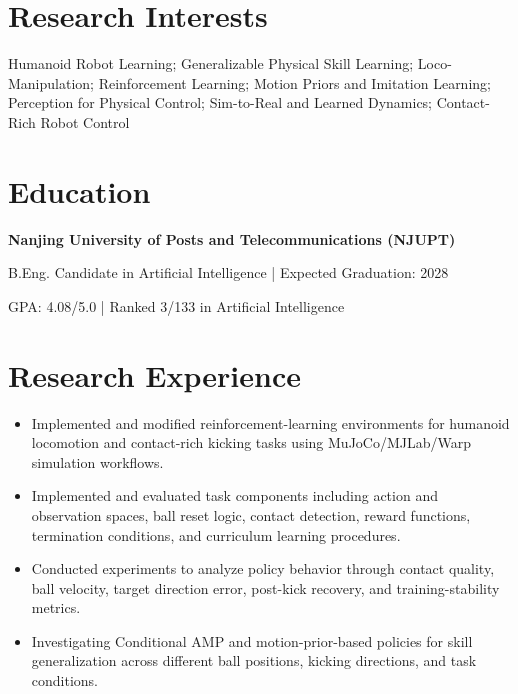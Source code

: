 \documentclass[10pt]{article}
\begin{document}

\section{Research Interests}\color{black}
Humanoid Robot Learning; Generalizable Physical Skill Learning; Loco-Manipulation; Reinforcement Learning; Motion Priors and Imitation Learning; Perception for Physical Control; Sim-to-Real and Learned Dynamics; Contact-Rich Robot Control

\section{Education}\color{black}
{\sffamily\color{cvnavy}\bfseries Nanjing University of Posts and Telecommunications (NJUPT)}\par
\vspace{1pt}B.Eng. Candidate in Artificial Intelligence \quad | \quad Expected Graduation: 2028\par
\vspace{1pt}GPA: 4.08/5.0 \quad | \quad Ranked 3/133 in Artificial Intelligence

\section{Research Experience}\color{black}
\begin{itemize}
  \item Implemented and modified reinforcement-learning environments for humanoid locomotion and contact-rich kicking tasks using MuJoCo/MJLab/Warp simulation workflows.
  \item Implemented and evaluated task components including action and observation spaces, ball reset logic, contact detection, reward functions, termination conditions, and curriculum learning procedures.
  \item Conducted experiments to analyze policy behavior through contact quality, ball velocity, target direction error, post-kick recovery, and training-stability metrics.
  \item Investigating Conditional AMP and motion-prior-based policies for skill generalization across different ball positions, kicking directions, and task conditions.
\end{itemize}
\end{document}
